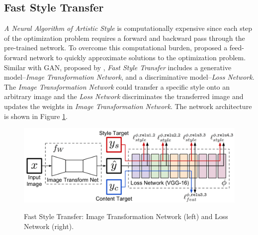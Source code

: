 \documentclass{article} %
\begin{document}
\subsection{Fast Style Transfer}
\emph{A Neural Algorithm of Artistic Style} is computationally expensive since each step of the optimization problem requires a forward and backward pass through the pre-trained network. To overcome this computational burden, \cite{1603.08155} proposed a feed-forward network to quickly approximate solutions to the optimization problem.\\
Similar with GAN, proposed by \cite{1406.2661}, \emph{Fast Style Transfer} includes a generative model--\emph{Image Transformation Network}, and a discriminative model--\emph{Loss Network}. The \emph{Image Transformation Network} could transfer a specific style onto an arbitrary image and the \emph{Loss Network} discriminates the transferred image and updates the weights in \emph{Image Transformation Network}. The network architecture is shown in Figure \ref{fig:fast}.\\
\begin{figure}[h]
\centering
\includegraphics[scale=0.3]{fast.png}
\label{fig:fast}
\caption{Fast Style Transfer: Image Transformation Network (left) and Loss Network (right).}
\end{figure}
\end{document}
